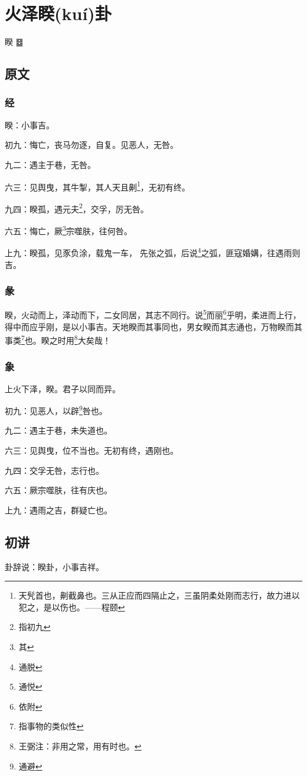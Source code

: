 \documentclass[12pt,oneside]{book}
\begin{document}
\chapter{火泽睽(kuí)卦}
睽 {\Large ䷥}

\section{原文}

\subsection{经}
睽：小事吉。

初九：悔亡，丧马勿逐，自复。见恶人，无咎。

九二：遇主于巷，无咎。

六三：见舆曳，其牛掣，其人天且劓\footnote{天髠首也，劓截鼻也。三从正应而四隔止之，三虽阴柔处刚而志行，故力进以犯之，是以伤也。——程颐}，无初有终。

九四：睽孤，遇元夫\footnote{指初九}，交孚，厉无咎。

六五：悔亡，厥\footnote{其}宗噬肤，往何咎。

上九：睽孤，见豕负涂，载鬼一车， 先张之弧，后说\footnote{通脱}之弧，匪寇婚媾，往遇雨则吉。

\subsection{彖}
睽，火动而上，泽动而下，二女同居，其志不同行。说\footnote{通悦}而丽\footnote{依附}乎明，柔进而上行，得中而应乎刚，是以小事吉。天地睽而其事同也，男女睽而其志通也，万物睽而其事类\footnote{指事物的类似性}也。睽之时用\footnote{王弼注：非用之常，用有时也。}大矣哉！

\subsection{象}
上火下泽，睽。君子以同而异。

初九：见恶人，以辟\footnote{通避}咎也。

九二：遇主于巷，未失道也。

六三：见舆曳，位不当也。无初有终，遇刚也。

九四：交孚无咎，志行也。

六五：厥宗噬肤，往有庆也。

上九：遇雨之吉，群疑亡也。

\section{初讲}
卦辞说：睽卦，小事吉祥。
\end{document}
